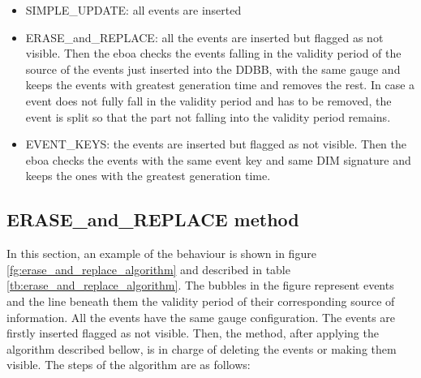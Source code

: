 \begin{itemize}
\item SIMPLE\_UPDATE: all events are inserted
\item ERASE\_and\_REPLACE: all the events are inserted but flagged as not visible. Then the \acrshort{eboa} checks the events falling in the validity period of the source of the events just inserted into the DDBB, with the same gauge and keeps the events with greatest generation time and removes the rest. In case a event does not fully fall in the validity period and has to be removed, the event is split so that the part not falling into the validity period remains.
\item EVENT\_KEYS: the events are inserted but flagged as not visible. Then the \acrshort{eboa} checks the events with the same event key and same DIM signature and keeps the ones with the greatest generation time.
\end{itemize}

\subsection {ERASE\_and\_REPLACE method}

In this section, an example of the behaviour is shown in figure \ref{fg:erase_and_replace_algorithm} and described in table \ref{tb:erase_and_replace_algorithm}. The bubbles in the figure represent events and the line beneath them the validity period of their corresponding source of information. All the events have the same gauge configuration.
The events are firstly inserted flagged as not visible. Then, the method, after applying the algorithm described bellow, is in charge of deleting the events or making them visible.
The steps of the algorithm are as follows:

